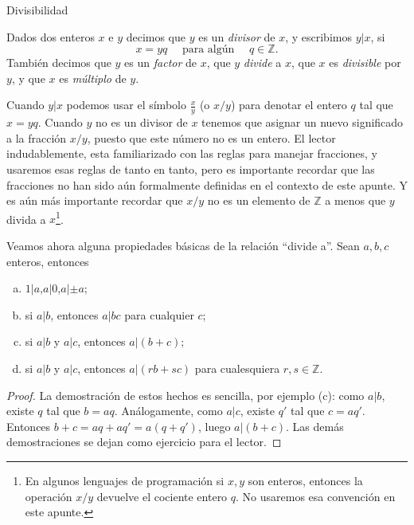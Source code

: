 \begin{section}{Divisibilidad}\label{1.6}


\begin{definicion}Dados dos enteros $x$ e $y$ decimos que $y$ es un {\em divisor} de $x$, y escribimos $y|x$, si
$$
x=yq\quad\text{ para algún }\quad q\in \mathbb Z.
$$
También decimos que $y$ es un {\em factor} de $x$, que $y$ {\em divide} a $x$, que $x$ es {\em divisible} por $y$, y que $x$ es {\em múltiplo} de $y$.
\end{definicion}

Cuando $y|x$ podemos usar el símbolo $\frac{x}{y}$ (o $x/y$) para
denotar el entero $q$ tal que $ x=yq$. Cuando $y$ no es un divisor
de $x$ tenemos que asignar un nuevo significado a la fracción
$x/y$, puesto que este número no es un entero. El lector
indudablemente, esta familiarizado con las reglas para manejar
fracciones, y usaremos esas reglas de tanto en tanto, pero es
importante recordar que las fracciones no han sido aún formalmente
definidas en el contexto de este apunte. Y es aún más importante
recordar que $x/y$ no es un elemento de $\mathbb Z$ a menos que
$y$ divida a $x$\footnote{En algunos lenguajes de programación si $x,y$ son enteros, entonces la operación $x/y$ devuelve el cociente entero $q$. No usaremos esa convención en este apunte.}.


\begin{observacion}\label{prop-divide-a-propiedades} Veamos ahora alguna propiedades básicas de la relación ``divide a''. Sean $a,b,c$ enteros, entonces
\begin{enumerate}[a)]
\item $1|a$,\qquad $a|0$,\qquad $a|\pm a$;
\item si $a|b$, entonces $a|bc$ para cualquier $c$;
\item si $a|b$ y $a|c$, entonces $a|(b+c)$;
\item\label{prop-divide-a-propiedades-item-4} si $a|b$ y $a|c$, entonces $a|(rb+sc)$ para cualesquiera $r,s \in \mathbb Z$.
\end{enumerate}
\begin{proof}
La demostración de estos hechos es sencilla, por ejemplo (c): como $a|b$, existe $q$ tal que $b = aq$. Análogamente, como $a|c$, existe $q'$ tal que $c = aq'$. Entonces $b+c = aq+aq' = a(q+q')$, luego $a|(b+c)$.  
Las demás demostraciones se dejan como ejercicio para el lector. 
\end{proof}
\end{observacion}



\end{section}
